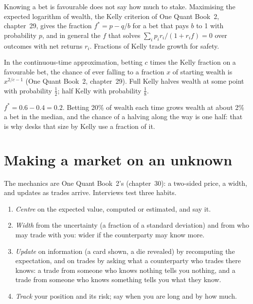 Knowing a bet is favourable does not say how much to stake. Maximising the expected logarithm of wealth, the
Kelly criterion of One Quant Book~2, chapter~29, gives the fraction $f^\ast = p - q/b$ for a bet that pays $b$ to
1 with probability $p$, and in general the $f$ that solves $\sum_i p_i r_i/(1 + r_i f) = 0$ over outcomes with net
returns $r_i$. Fractions of Kelly trade growth for safety.

\begin{proposition}\label{prop:iv:betting-and-market-making-games:halving}
In the continuous-time approximation, betting $c$ times the Kelly fraction on a favourable bet, the chance of
ever falling to a fraction $x$ of starting wealth is $x^{2/c - 1}$ (One Quant Book~2, chapter~29). Full Kelly
halves wealth at some point with probability $\tfrac12$; half Kelly with probability $\tfrac18$.
\end{proposition}

\begin{example}\label{ex:iv:betting-and-market-making-games:kelly}
$f^\ast = 0.6 - 0.4 = 0.2$. Betting 20\% of wealth each time grows wealth at about 2\% a bet in the median, and the
chance of a halving along the way is one half: that is why desks that size by Kelly use a fraction of it.
\end{example}

\section{Making a market on an unknown}

The mechanics are One Quant Book~2's (chapter~30): a two-sided price, a width, and updates as trades arrive.
Interviews test three habits.

\begin{method}\label{met:iv:betting-and-market-making-games:market}
\begin{enumerate}
\item \emph{Centre} on the expected value, computed or estimated, and say it.
\item \emph{Width} from the uncertainty (a fraction of a standard deviation) and from who may trade with you: wider
if the counterparty may know more.
\item \emph{Update} on information (a card shown, a die revealed) by recomputing the expectation, and on trades by
asking what a counterparty who trades there knows: a trade from someone who knows nothing tells you nothing,
and a trade from someone who knows something tells you what they know.
\item \emph{Track} your position and its risk; say when you are long and by how much.
\end{enumerate}
\end{method}

